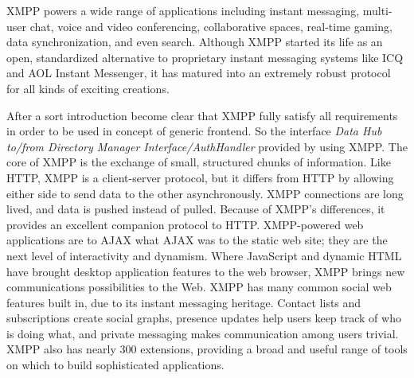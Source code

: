       XMPP powers a wide range of applications including instant messaging, multi-user chat, voice and video conferencing, collaborative spaces, real-time gaming, data synchronization, and even search. Although XMPP started its life as an open, standardized alternative to proprietary instant messaging systems like ICQ and AOL Instant Messenger, it has matured into an extremely robust protocol for all kinds of exciting creations.

      After a sort introduction become clear that XMPP fully satisfy all requirements in order to be used in concept of generic frontend. So the interface \emph{Data Hub to/from Directory Manager Interface/AuthHandler} provided by using XMPP.
      \newline
      The core of XMPP is the exchange of small, structured chunks of information. Like HTTP, XMPP is a client-server protocol, but it differs from HTTP by allowing either side to send data to the other asynchronously. XMPP connections are long lived, and data is pushed instead of pulled. Because of XMPP’s differences, it provides an excellent companion protocol to HTTP. XMPP-powered web applications are to AJAX what AJAX was to the static web site; they are the next level of interactivity and dynamism. Where JavaScript and dynamic HTML have brought desktop application features to the web browser, XMPP brings new communications possibilities to the Web. XMPP has many common social web features built in, due to its instant messaging heritage. Contact lists and subscriptions create social graphs, presence updates help users keep track of who is doing what, and private messaging makes communication among users trivial. XMPP also has nearly 300 extensions, providing a broad and useful range of tools on which to build sophisticated applications. 
      \newline
